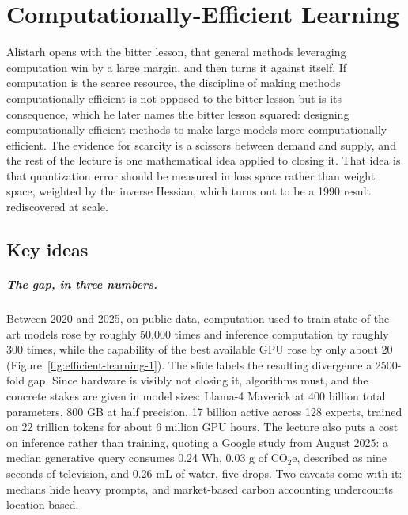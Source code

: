 \chapter{Computationally-Efficient Learning}
\label{ch:10-efficient-learning}


Alistarh opens with the bitter lesson, that general methods leveraging computation win by a large
margin, and then turns it against itself. If computation is the scarce resource, the discipline
of making methods computationally efficient is not opposed to the bitter lesson but is its
consequence, which he later names the bitter lesson squared: designing computationally efficient
methods to make large models more computationally efficient. The evidence for scarcity is a
scissors between demand and supply, and the rest of the lecture is one mathematical idea applied
to closing it. That idea is that quantization error should be measured in loss space rather than
weight space, weighted by the inverse Hessian, which turns out to be a 1990 result rediscovered
at scale.

\section*{Key ideas}

\paragraph{The gap, in three numbers.} Between 2020 and 2025, on public data, computation used to
train state-of-the-art models rose by roughly 50,000 times and inference computation by roughly
300 times, while the capability of the best available GPU rose by only about 20
(Figure~\ref{fig:efficient-learning-1}). The slide labels the resulting divergence a 2500-fold gap.
Since hardware is visibly not closing it, algorithms must, and the concrete stakes are given in
model sizes: Llama-4 Maverick at 400 billion total parameters, 800 GB at half precision, 17
billion active across 128 experts, trained on 22 trillion tokens for about 6 million GPU hours.
The lecture also puts a cost on inference rather than training, quoting a Google study from
August 2025: a median generative query consumes 0.24 Wh, 0.03 g of CO$_2$e, described as nine
seconds of television, and 0.26 mL of water, five drops. Two caveats come with it: medians hide heavy prompts, and
market-based carbon accounting undercounts location-based.

